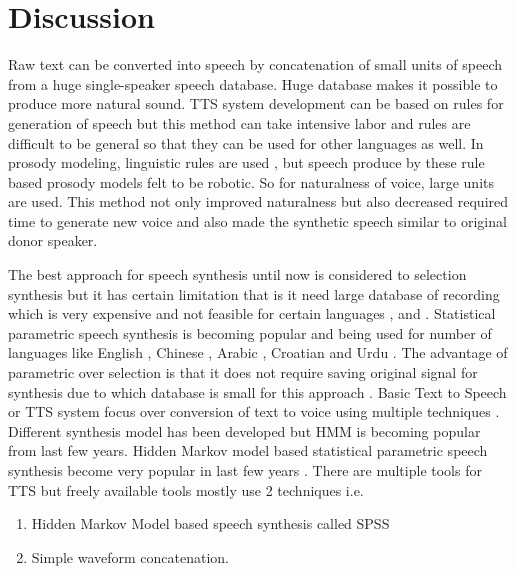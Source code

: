 \section{Discussion}
Raw text can be converted into speech by concatenation of small units of speech from a huge single-speaker speech database. Huge database makes it possible to produce more natural sound. TTS system development can be based on rules for generation of speech but this method can take intensive labor and rules are difficult to be general so that they can be used for other languages as well. In prosody modeling, linguistic rules are used \cite{klatt1987review}, \cite{pierrehumbert1981synthesizing} but speech produce by these rule based prosody models felt to be robotic. So for naturalness of voice, large units are used. This method not only improved naturalness but also decreased required time to generate new voice and also made the synthetic speech similar to original donor speaker.

The best approach for speech synthesis until now is considered to selection synthesis but it has certain limitation that is it need large database of recording which is very expensive and not feasible for certain languages \cite{black1994chatr}, \cite{hunt1996unit} and \cite{black2003unit}. Statistical parametric speech synthesis is becoming popular and being used for number of languages like English \cite{tokuda2002hmm}, Chinese \cite{qian2006hmm}, Arabic \cite{abdel2006improving}, Croatian \cite{martincic2006croatian} and Urdu \cite{ahmed2014hmm}. The advantage of parametric over selection is that it does not require saving original signal for synthesis due to which database is small for this approach \cite{zen2009statistical}. Basic Text to Speech or TTS system focus over conversion of text to voice using multiple techniques \cite{merritt2013investigating}. Different synthesis model has been developed but HMM is becoming popular from last few years. Hidden
Markov model based statistical parametric speech synthesis become very popular in last few years \cite{ze2013statistical}. There are multiple tools for TTS but freely available tools mostly use 2 techniques i.e.

\begin{enumerate}
	\item Hidden Markov Model based speech synthesis called SPSS
	\item Simple waveform concatenation.
\end{enumerate}

